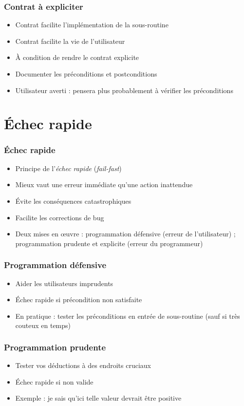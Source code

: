 \documentclass[english, french]{beamer}
\begin{document}
\begin{frame}
	\frametitle{Contrat à expliciter}
	\begin{itemize}
		\item Contrat facilite l’implémentation de la sous-routine
		\item Contrat facilite la vie de l’utilisateur
		\item À condition de rendre le contrat explicite
		\item Documenter les préconditions et postconditions
		\item Utilisateur averti : pensera plus probablement à vérifier les préconditions
	\end{itemize}
\end{frame}

\section{Échec rapide}
\begin{frame}
	\frametitle{Échec rapide}
	\begin{itemize}
		\item Principe de l’\emph{échec rapide} (\emph{fail-fast})
		\item Mieux vaut une erreur immédiate qu’une action inattendue
		\item Évite les conséquences catastrophiques
		\item Facilite les corrections de bug
		\item Deux mises en œuvre : programmation défensive (erreur de l’utilisateur) ; programmation prudente et explicite (erreur du programmeur)
	\end{itemize}
\end{frame}

\begin{frame}
	\frametitle{Programmation défensive}
	\begin{itemize}
		\item Aider les utilisateurs imprudents
		\item Échec rapide si précondition non satisfaite
		\item En pratique : tester les préconditions en entrée de sous-routine {\tiny (sauf si très couteux en temps)}
	\end{itemize}
\end{frame}

\begin{frame}
	\frametitle{Programmation prudente}
	\begin{itemize}
		\item Tester vos déductions à des endroits cruciaux 
		\item Échec rapide si non valide
		\item Exemple : je sais qu’ici telle valeur devrait être positive
	\end{itemize}
\end{frame}
\end{document}
